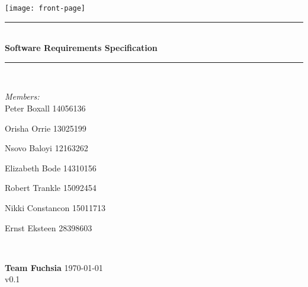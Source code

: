 \documentclass{article}
\begin{document}
	
\begin{titlepage}
	\newcommand{\HRule}{\rule{\linewidth}{0.5mm}} %

	\center %
	 

	\texttt{[image: front-page]}


	\HRule \\[0.4cm]
	{ \huge \bfseries Software Requirements Specification}\\[0.4cm] %
	\HRule \\[1.5cm]
	 

	\begin{minipage}{0.5\textwidth}
	\begin{flushleft} \large
	\emph{Members:}\\%
	Peter Boxall 14056136	
	
	Orisha Orrie 13025199
	
	Nsovo Baloyi 12163262
	
	Elizabeth Bode 14310156
		
	Robert Trankle 15092454

	Nikki Constancon 15011713

	Ernst Eksteen 28398603
	\end{flushleft}
	\end{minipage}
	~
	\begin{minipage}{0.4\textwidth}
	\begin{flushright} \large
	{ \huge \bfseries Team Fuchsia }%
	{\large \today}\\
	{\large v0.1}
	\end{flushright}
	\end{minipage}\\[4cm]
\end{titlepage}
\end{document}
